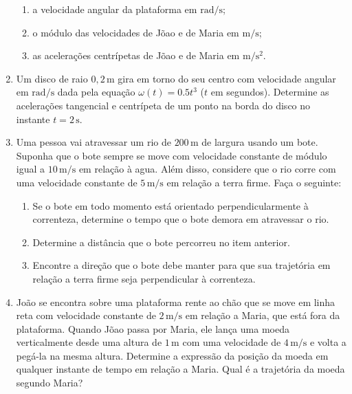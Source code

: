 \documentclass[fontsize=12pt]{scrartcl}
\newcommand{\un}[1]{\mathrm{#1}}
\begin{document}
\begin{enumerate}
\begin{enumerate}
  \item a velocidade angular da plataforma em $\un{rad}/\un s$;
  \item o módulo das velocidades de Jõao e de Maria em $\un m/\un s$;
  \item as acelerações centrípetas de Jõao e de Maria em
    $\un m/\un{s}^2$.
  \end{enumerate}
\item Um disco de raio $0,2\,\un m$ gira em torno do seu centro com
  velocidade angular em $\un{rad}/\un s$ dada pela equação
  $\omega(t)=0.5t^3$ ($t$ em segundos). Determine as acelerações
  tangencial e centrípeta de um ponto na borda do disco no instante
  $t=2\,\un s$.
\item Uma pessoa vai atravessar um rio de $200\,\un m$ de largura
  usando um bote. Suponha que o bote sempre se move com velocidade
  constante de módulo igual a $10\,\un m/\un s$ em relação à
  agua. Além disso, considere que o rio corre com uma velocidade
  constante de $5\,\un m/\un s$ em relação a terra firme. Faça o
  seguinte:
  \begin{enumerate}
  \item Se o bote em todo momento está orientado perpendicularmente à
    correnteza, determine o tempo que o bote demora em atravessar o
    rio.
  \item Determine a distância que o bote percorreu no item anterior.
  \item Encontre a direção que o bote debe manter para que sua
    trajetória em relação a terra firme seja perpendicular à
    correnteza.
  \end{enumerate}
\item João se encontra sobre uma plataforma rente ao chão que se move
  em linha reta com velocidade constante de $2\,\un m/\un s$ em
  relação a Maria, que está fora da plataforma. Quando Jõao passa por
  Maria, ele lança uma moeda verticalmente desde uma altura de
  $1\,\un m$ com uma velocidade de $4\,\un m/\un s$ e volta a pegá-la
  na mesma altura. Determine a expressão da posição da moeda em
  qualquer instante de tempo em relação a Maria. Qual é a trajetória
  da moeda segundo Maria?
\end{enumerate}
\end{document}
